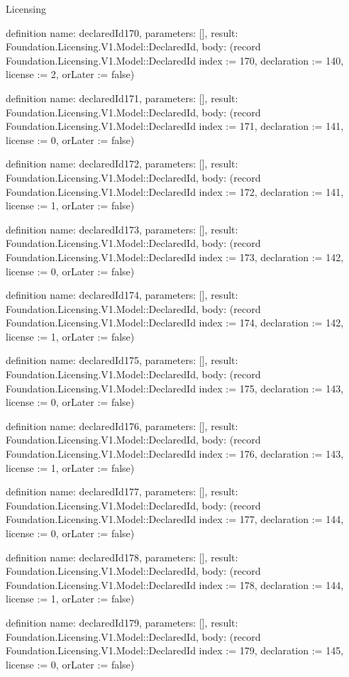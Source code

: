 \begin{lexlean}{Licensing}
\begin{semanticmodule}
definition{
  name: declaredId170,
  parameters: [],
  result: Foundation.Licensing.V1.Model::DeclaredId,
  body: (record Foundation.Licensing.V1.Model::DeclaredId {index := 170, declaration := 140, license := 2, orLater := false})
}

definition{
  name: declaredId171,
  parameters: [],
  result: Foundation.Licensing.V1.Model::DeclaredId,
  body: (record Foundation.Licensing.V1.Model::DeclaredId {index := 171, declaration := 141, license := 0, orLater := false})
}

definition{
  name: declaredId172,
  parameters: [],
  result: Foundation.Licensing.V1.Model::DeclaredId,
  body: (record Foundation.Licensing.V1.Model::DeclaredId {index := 172, declaration := 141, license := 1, orLater := false})
}

definition{
  name: declaredId173,
  parameters: [],
  result: Foundation.Licensing.V1.Model::DeclaredId,
  body: (record Foundation.Licensing.V1.Model::DeclaredId {index := 173, declaration := 142, license := 0, orLater := false})
}

definition{
  name: declaredId174,
  parameters: [],
  result: Foundation.Licensing.V1.Model::DeclaredId,
  body: (record Foundation.Licensing.V1.Model::DeclaredId {index := 174, declaration := 142, license := 1, orLater := false})
}

definition{
  name: declaredId175,
  parameters: [],
  result: Foundation.Licensing.V1.Model::DeclaredId,
  body: (record Foundation.Licensing.V1.Model::DeclaredId {index := 175, declaration := 143, license := 0, orLater := false})
}

definition{
  name: declaredId176,
  parameters: [],
  result: Foundation.Licensing.V1.Model::DeclaredId,
  body: (record Foundation.Licensing.V1.Model::DeclaredId {index := 176, declaration := 143, license := 1, orLater := false})
}

definition{
  name: declaredId177,
  parameters: [],
  result: Foundation.Licensing.V1.Model::DeclaredId,
  body: (record Foundation.Licensing.V1.Model::DeclaredId {index := 177, declaration := 144, license := 0, orLater := false})
}

definition{
  name: declaredId178,
  parameters: [],
  result: Foundation.Licensing.V1.Model::DeclaredId,
  body: (record Foundation.Licensing.V1.Model::DeclaredId {index := 178, declaration := 144, license := 1, orLater := false})
}

definition{
  name: declaredId179,
  parameters: [],
  result: Foundation.Licensing.V1.Model::DeclaredId,
  body: (record Foundation.Licensing.V1.Model::DeclaredId {index := 179, declaration := 145, license := 0, orLater := false})
}


\end{semanticmodule}
\end{lexlean}
